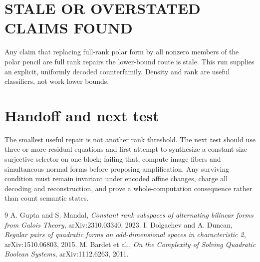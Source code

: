\documentclass[11pt]{article}
\begin{document}
\section{STALE OR OVERSTATED CLAIMS FOUND}
Any claim that replacing full-rank polar form by all nonzero members of the
polar pencil are full rank repairs the lower-bound route is stale.  This run
supplies an explicit, uniformly decoded counterfamily.  Density and rank are
useful classifiers, not work lower bounds.

\section{Handoff and next test}
The smallest useful repair is not another rank threshold.  The next test
should use three or more residual equations and first attempt to synthesize a
constant-size surjective selector on one block; failing that, compute image
fibers and simultaneous normal forms before proposing amplification.  Any
surviving condition must remain invariant under encoded affine changes,
charge all decoding and reconstruction, and prove a whole-computation
consequence rather than count semantic states.

\begin{thebibliography}{9}
A. Gupta and S. Mandal,
\emph{Constant rank subspaces of alternating bilinear forms from Galois
Theory}, arXiv:2310.03340, 2023.
I. Dolgachev and A. Duncan,
\emph{Regular pairs of quadratic forms on odd-dimensional spaces in
characteristic 2}, arXiv:1510.06803, 2015.
M. Bardet et al.,
\emph{On the Complexity of Solving Quadratic Boolean Systems},
arXiv:1112.6263, 2011.
\end{thebibliography}

\end{document}

